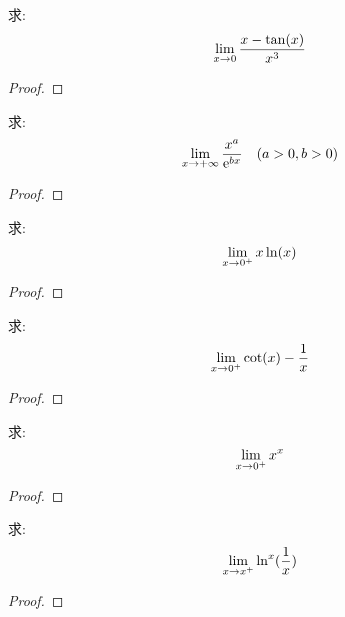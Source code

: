 \begin{example}
    求:
    \begin{equation*}
        \lim_{x \to 0 } \frac{x-\tan(x)}{x^3}
    \end{equation*}
\end{example}
\begin{proof}
    
\end{proof}

\begin{example}
    求:
    \begin{equation*}
        \lim_{x \to +\infty } \frac{x^a}{\mathrm{e}^{bx}} \quad (a > 0, b > 0)
    \end{equation*}
\end{example}
\begin{proof}
    
\end{proof}

\begin{example}
    求:
    \begin{equation*}
        \lim_{x \to 0^+ } x\ln(x)
    \end{equation*}
\end{example}
\begin{proof}
    
\end{proof}

\begin{example}
    求:
    \begin{equation*}
        \lim_{x \to 0^+ } \cot(x)- \frac{1}{x}
    \end{equation*}
\end{example}
\begin{proof}
    
\end{proof}

\begin{example}
    求:
    \begin{equation*}
        \lim_{x \to 0^+ } x^x
    \end{equation*}
\end{example}
\begin{proof}
    
\end{proof}

\begin{example}
    求:
    \begin{equation*}
        \lim_{x \to x^+ } \ln^x(\frac{1}{x})
    \end{equation*}
\end{example}
\begin{proof}
    
\end{proof}


